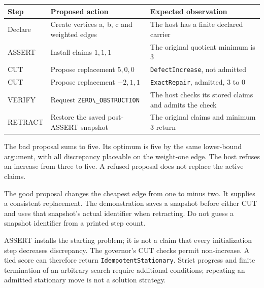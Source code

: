 \documentclass[
  11pt,
]{article}
\newcommand{\passthrough}[1]{#1}
\begin{document}
\begin{longtable}[]{@{}
  >{\raggedright\arraybackslash}p{}
  >{\raggedright\arraybackslash}p{}
  >{\raggedright\arraybackslash}p{}@{}}
\toprule\noalign{}
\begin{minipage}[b]{\linewidth}\raggedright
Step
\end{minipage} & \begin{minipage}[b]{\linewidth}\raggedright
Proposed action
\end{minipage} & \begin{minipage}[b]{\linewidth}\raggedright
Expected observation
\end{minipage} \\
\midrule\noalign{}
\endhead
\bottomrule\noalign{}
\endlastfoot
Declare & Create vertices a, b, c and weighted edges & The host has a
finite declared carrier \\
ASSERT & Install claims \(1,1,1\) & The original quotient minimum is
3 \\
CUT & Propose replacement \(5,0,0\) &
\passthrough{\lstinline!DefectIncrease!}, not admitted \\
CUT & Propose replacement \(-2,1,1\) &
\passthrough{\lstinline!ExactRepair!}, admitted, 3 to 0 \\
VERIFY & Request \passthrough{\lstinline!ZERO\_OBSTRUCTION!} & The host
checks its stored claims and admits the check \\
RETRACT & Restore the saved post-ASSERT snapshot & The original claims
and minimum 3 return \\
\end{longtable}

The bad proposal sums to five. Its optimum is five by the same
lower-bound argument, with all discrepancy placeable on the weight-one
edge. The host refuses an increase from three to five. A refused
proposal does not replace the active claims.

The good proposal changes the cheapest edge from one to minus two. It
supplies a consistent replacement. The demonstration saves a snapshot
before either CUT and uses that snapshot's actual identifier when
retracting. Do not guess a snapshot identifier from a printed step
count.

ASSERT installs the starting problem; it is not a claim that every
initialization step decreases discrepancy. The governor's CUT checks
permit non-increase. A tied score can therefore return
\passthrough{\lstinline!IdempotentStationary!}. Strict progress and
finite termination of an arbitrary search require additional conditions;
repeating an admitted stationary move is not a solution strategy.
\end{document}
